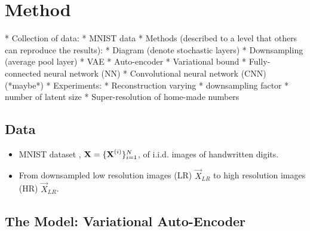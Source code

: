 \section{Method}
\label{sec:method}


* Collection of data:
	* MNIST data
* Methods (described to a level that others can reproduce the results):
	* Diagram (denote stochastic layers)
	* Downsampling (average pool layer)
	* VAE
		* Auto-encoder
		* Variational bound
	* Fully-connected neural network (NN)
	* Convolutional neural network (CNN) (*maybe*)
* Experiments:
	* Reconstruction varying
		* downsampling factor
		* number of latent size
	* Super-resolution of home-made numbers


\subsection{Data} %
\label{sub:data}
\begin{itemize}
	\item MNIST dataset \cite{MNIST}, $\bm{\mathrm{X}} = \{\bm{\mathrm{X}}^{(i)}\}^N_{i=1}$, of i.i.d. images of handwritten digits. 
	\item From downsampled low resolution images (LR) $\vec{X}_{LR}$ to high resolution images (HR) $\vec{X}_{LR}$. 
\end{itemize}

\subsection{The Model: Variational Auto-Encoder} %
\label{sub:the_model}

